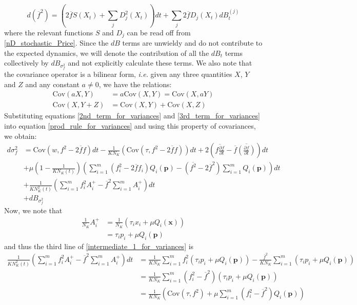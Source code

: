 \begin{equation}
\label{3rd_term_for_variances}
d(\overline{f}^2) = \left(2\overline{f}S(X_t) + \sum\limits_{j}D_j^2(X_t)\right)dt + \sum\limits_{j}2\overline{f}D_j(X_t)dB^{(j)}_t
\end{equation}
where the relevant functions $S$ and $D_j$ can be read off from \eqref{nD_stochastic_Price}. Since the $dB$ terms are unwieldy and do not contribute to the expected dynamics, we will denote the contribution of all the $dB_t$ terms collectively by $dB_{\sigma^2_{f}}$ and not explicitly calculate these terms. We also note that the covariance operator is a bilinear form, \emph{i.e.} given any three quantities $X$, $Y$ and $Z$ and any constant $a \neq 0$, we have the relations:
\begin{align*}
\textrm{Cov}(aX,Y) &= a\textrm{Cov}(X,Y) = \textrm{Cov}(X,aY)\\
\textrm{Cov}(X,Y+Z) &= \textrm{Cov}(X,Y)+\textrm{Cov}(X,Z)
\end{align*}
Substituting equations \eqref{2nd_term_for_variances} and \eqref{3rd_term_for_variances} into equation \eqref{prod_rule_for_variances} and using this property of covariances, we obtain:
\begin{equation}
\label{intermediate_1_for_variances}
\begin{aligned}
d\sigma^2_{f} &= \textrm{Cov}(w,f^2 - 2\overline{f}f)dt - \frac{1}{KN_K}\left(\textrm{Cov}(\tau,f^2 - 2\overline{f}f)\right)dt + 2\left(\overline{f\frac{\partial f}{\partial t}} - \overline{f}\overline{\left(\frac{\partial f}{\partial t}\right)}\right)dt\\
&+ \mu\left(1-\frac{1}{KN_K(t)}\right)\left(\sum\limits_{i=1}^{m}(f^2_i - 2\overline{f}f_i)Q_i(\mathbf{p}) - (\overline{f^2}-2\overline{f}^2)\sum\limits_{i=1}^{m}Q_i(\mathbf{p})\right)dt\\
&+ \frac{1}{KN^2_{K}(t)}\left(\sum\limits_{i=1}^{m}f^2_iA_i^+ - \overline{f}^2\sum\limits_{i=1}^{m}A_i^+\right)dt\\
&+ dB_{\sigma^2_{f}}
\end{aligned}
\end{equation}
Now, we note that
\begin{align}
\frac{1}{N_K}A_i^+ &= \frac{1}{N_K}\left(\tau_ix_i + \mu Q_i(\mathbf{x})\right)\\
&= \tau_ip_i + \mu Q_i(\mathbf{p})
\end{align}
and thus the third line of \eqref{intermediate_1_for_variances} is
\begin{align}
\frac{1}{KN^2_{K}(t)}\left(\sum\limits_{i=1}^{m}f^2_iA_i^+ - \overline{f}^2\sum\limits_{i=1}^{m}A_i^+\right)dt &= \frac{1}{KN_{K}}\sum\limits_{i=1}^{m}f_i^2\left(\tau_ip_i + \mu Q_i(\mathbf{p})\right) - \frac{\overline{f}^2}{KN_{K}}\sum\limits_{i=1}^{m}\left(\tau_ip_i + \mu Q_i(\mathbf{p})\right)\\
&= \frac{1}{KN_K}\sum\limits_{i=1}^{m}\left(f_i^2 - \overline{f}^2\right)\left(\tau_ip_i + \mu Q_i(\mathbf{p})\right)\\
&= \frac{1}{KN_K}\left(\textrm{Cov}(\tau,f^2)+\mu \sum\limits_{i=1}^{m}\left(f_i^2 - \overline{f}^2\right)Q_i(\mathbf{p})\right)
\end{align}
